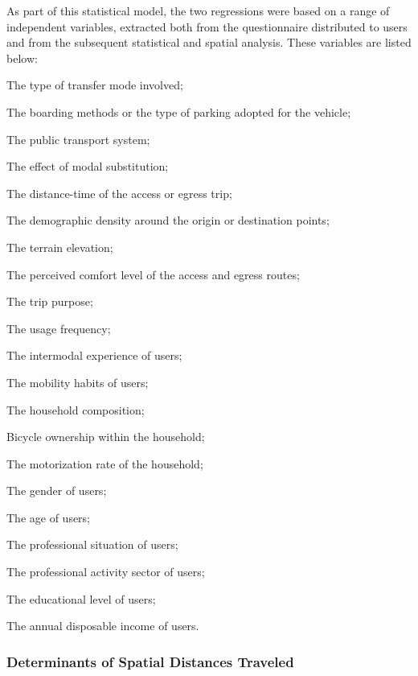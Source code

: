 \begin{refsegment}
As part of this statistical model, the two regressions were based on a range of independent variables, extracted both from the questionnaire distributed to users and from the subsequent statistical and spatial analysis. These variables are listed below:
\begin{customitemize}
    \item The type of transfer mode involved;
    \item The boarding methods or the type of parking adopted for the vehicle;
    \item The public transport system;
    \item The effect of modal substitution;
    \item The distance-time of the access or egress trip;
    \item The demographic density around the origin or destination points;
    \item The terrain elevation;
    \item The perceived comfort level of the access and egress routes;
    \item The trip purpose;
    \item The usage frequency;
    \item The intermodal experience of users;
    \item The mobility habits of users;
    \item The household composition;
    \item Bicycle ownership within the household;
    \item The motorization rate of the household;
    \item The gender of users;
    \item The age of users;
    \item The professional situation of users;
    \item The professional activity sector of users;
    \item The educational level of users;
    \item The annual disposable income of users.
\end{customitemize}%

\subsubsection*{Determinants of Spatial Distances Traveled
    \label{chap5:facteurs-modeles-OLS-log-log}
    }


\end{refsegment}
